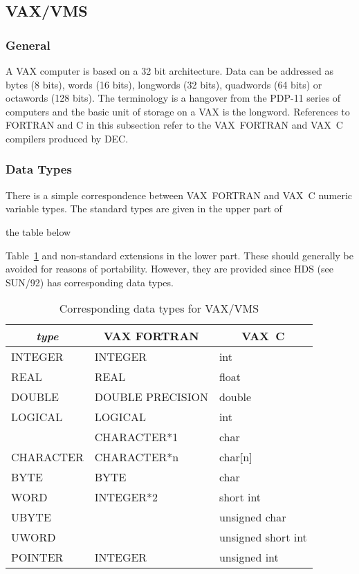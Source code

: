 \documentclass[twoside,11pt]{article}
\newcommand{\latex}[1]{#1}
\newcommand{\xref}[3]{#1}
\newcommand{\xlabel}[1]{}
\renewcommand{\_}{\texttt{\symbol{95}}}
\begin{document}
\subsection{\xlabel{vaxvms}VAX/VMS}

\subsubsection{General}

A VAX computer is based on a 32 bit architecture. Data can be addressed as
bytes (8 bits), words (16 bits), longwords (32 bits), quadwords (64 bits) or
octawords (128 bits). The terminology is a hangover from the PDP-11 series of
computers and the basic unit of storage on a VAX is the longword. References to
FORTRAN and C in this subsection refer to the VAX~FORTRAN and VAX~C compilers
produced by DEC\@.

\subsubsection{Data Types}

There is a simple correspondence between VAX~FORTRAN and VAX~C numeric variable
types. The standard types are given in the upper part of
\begin{htmlonly}
the table below
\end{htmlonly}
\latex{Table~\ref{vms_datatypes}} and non-standard extensions in the lower 
part. 
These should generally be avoided for reasons of portability. However, they are
provided since 
\xref{HDS}{sun92}{} \latex{(see SUN/92)}
has corresponding data types.

\begin{table}[htb]
\begin{center}
\begin{tabular}{|l|l|l|} \hline
\multicolumn{1}{|c|}{\textit{type}} & \multicolumn{1}{|c|}{VAX FORTRAN} &
\multicolumn{1}{c|}{VAX~C} \\ \hline
INTEGER & INTEGER & int \\
REAL & REAL & float \\
DOUBLE & DOUBLE PRECISION & double \\
LOGICAL & LOGICAL & int \\
& CHARACTER*1 & char \\
CHARACTER & CHARACTER*n & char[n] \\ \hline
BYTE & BYTE & char \\
WORD & INTEGER*2 & short int\\
UBYTE & & unsigned char\\
UWORD & & unsigned short int\\ \hline
POINTER & INTEGER & unsigned int\\ \hline
\end{tabular}
\end{center}
\caption{Corresponding data types for VAX/VMS}
\label{vms_datatypes}
\end{table}
\end{document}
